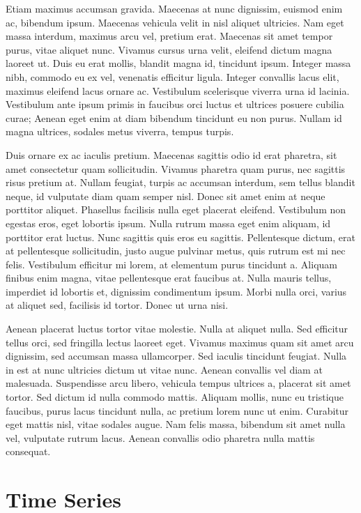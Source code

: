 \documentclass[
  letterpaper,
  DIV=11,
  numbers=noendperiod]{scrreprt}
\begin{document}
Etiam maximus accumsan gravida. Maecenas at nunc dignissim, euismod enim
ac, bibendum ipsum. Maecenas vehicula velit in nisl aliquet ultricies.
Nam eget massa interdum, maximus arcu vel, pretium erat. Maecenas sit
amet tempor purus, vitae aliquet nunc. Vivamus cursus urna velit,
eleifend dictum magna laoreet ut. Duis eu erat mollis, blandit magna id,
tincidunt ipsum. Integer massa nibh, commodo eu ex vel, venenatis
efficitur ligula. Integer convallis lacus elit, maximus eleifend lacus
ornare ac. Vestibulum scelerisque viverra urna id lacinia. Vestibulum
ante ipsum primis in faucibus orci luctus et ultrices posuere cubilia
curae; Aenean eget enim at diam bibendum tincidunt eu non purus. Nullam
id magna ultrices, sodales metus viverra, tempus turpis.

Duis ornare ex ac iaculis pretium. Maecenas sagittis odio id erat
pharetra, sit amet consectetur quam sollicitudin. Vivamus pharetra quam
purus, nec sagittis risus pretium at. Nullam feugiat, turpis ac accumsan
interdum, sem tellus blandit neque, id vulputate diam quam semper nisl.
Donec sit amet enim at neque porttitor aliquet. Phasellus facilisis
nulla eget placerat eleifend. Vestibulum non egestas eros, eget lobortis
ipsum. Nulla rutrum massa eget enim aliquam, id porttitor erat luctus.
Nunc sagittis quis eros eu sagittis. Pellentesque dictum, erat at
pellentesque sollicitudin, justo augue pulvinar metus, quis rutrum est
mi nec felis. Vestibulum efficitur mi lorem, at elementum purus
tincidunt a. Aliquam finibus enim magna, vitae pellentesque erat
faucibus at. Nulla mauris tellus, imperdiet id lobortis et, dignissim
condimentum ipsum. Morbi nulla orci, varius at aliquet sed, facilisis id
tortor. Donec ut urna nisi.

Aenean placerat luctus tortor vitae molestie. Nulla at aliquet nulla.
Sed efficitur tellus orci, sed fringilla lectus laoreet eget. Vivamus
maximus quam sit amet arcu dignissim, sed accumsan massa ullamcorper.
Sed iaculis tincidunt feugiat. Nulla in est at nunc ultricies dictum ut
vitae nunc. Aenean convallis vel diam at malesuada. Suspendisse arcu
libero, vehicula tempus ultrices a, placerat sit amet tortor. Sed dictum
id nulla commodo mattis. Aliquam mollis, nunc eu tristique faucibus,
purus lacus tincidunt nulla, ac pretium lorem nunc ut enim. Curabitur
eget mattis nisl, vitae sodales augue. Nam felis massa, bibendum sit
amet nulla vel, vulputate rutrum lacus. Aenean convallis odio pharetra
nulla mattis consequat.

\chapter{Time Series}\label{time-series}
\end{document}
